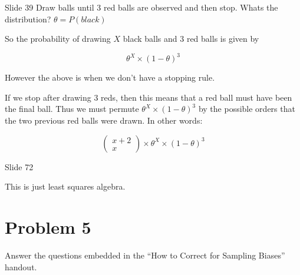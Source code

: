 \documentclass{article}
\begin{document}
\begin{problem}{Slide 39}
Draw balls until 3 red balls are observed and then stop.
Whats the distribution? $\theta =P(black)$
\end{problem}

So the probability of drawing $X$ black balls and $3$ red balls is given by

$$
\theta ^ X \times (1-\theta)^3
$$

However the above is when we don't have a stopping rule. 

If we stop after drawing 3 reds, then this means that a red ball must have been the final ball. Thus we must permute $\theta ^ X \times (1-\theta)^3$ by the possible orders that the two previous red balls were drawn. In other words:

$$
\left(\begin{array}{c}x+2 \\ x\end{array}\right)\times \theta ^ X \times (1-\theta)^3
$$
\begin{problem}{Slide 72}
\end{problem}

This is just least squares algebra.
\newpage

\section*{Problem 5}
Answer the questions embedded in the ``How to Correct for Sampling Biases'' handout.
\end{document}
